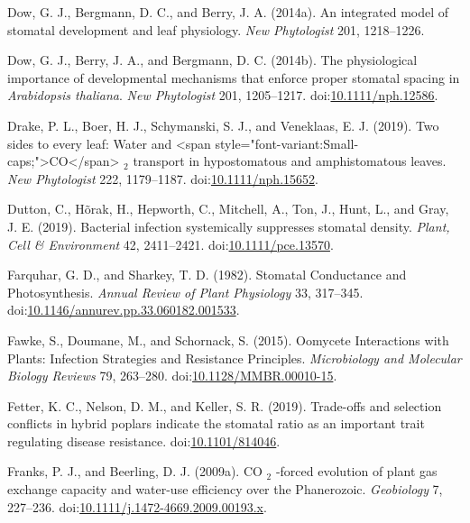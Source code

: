 \documentclass[utf8]{frontiersSCNS}
\begin{document}
\leavevmode\hypertarget{ref-dow_integrated_2014}{}%
Dow, G. J., Bergmann, D. C., and Berry, J. A. (2014a). An integrated
model of stomatal development and leaf physiology. \emph{New
Phytologist} 201, 1218--1226.

\leavevmode\hypertarget{ref-dow_physiological_2014}{}%
Dow, G. J., Berry, J. A., and Bergmann, D. C. (2014b). The physiological
importance of developmental mechanisms that enforce proper stomatal
spacing in \emph{Arabidopsis thaliana}. \emph{New Phytologist} 201,
1205--1217.
doi:\href{https://doi.org/10.1111/nph.12586}{10.1111/nph.12586}.

\leavevmode\hypertarget{ref-drake_two_2019}{}%
Drake, P. L., Boer, H. J., Schymanski, S. J., and Veneklaas, E. J.
(2019). Two sides to every leaf: Water and \textless span
style="font-variant:Small-caps;"\textgreater CO\textless/span\textgreater{}
\(_{\textrm{2}}\) transport in hypostomatous and amphistomatous leaves.
\emph{New Phytologist} 222, 1179--1187.
doi:\href{https://doi.org/10.1111/nph.15652}{10.1111/nph.15652}.

\leavevmode\hypertarget{ref-dutton_bacterial_2019}{}%
Dutton, C., Hõrak, H., Hepworth, C., Mitchell, A., Ton, J., Hunt, L.,
and Gray, J. E. (2019). Bacterial infection systemically suppresses
stomatal density. \emph{Plant, Cell \& Environment} 42, 2411--2421.
doi:\href{https://doi.org/10.1111/pce.13570}{10.1111/pce.13570}.

\leavevmode\hypertarget{ref-farquhar_stomatal_1982}{}%
Farquhar, G. D., and Sharkey, T. D. (1982). Stomatal Conductance and
Photosynthesis. \emph{Annual Review of Plant Physiology} 33, 317--345.
doi:\href{https://doi.org/10.1146/annurev.pp.33.060182.001533}{10.1146/annurev.pp.33.060182.001533}.

\leavevmode\hypertarget{ref-fawke_oomycete_2015}{}%
Fawke, S., Doumane, M., and Schornack, S. (2015). Oomycete Interactions
with Plants: Infection Strategies and Resistance Principles.
\emph{Microbiology and Molecular Biology Reviews} 79, 263--280.
doi:\href{https://doi.org/10.1128/MMBR.00010-15}{10.1128/MMBR.00010-15}.

\leavevmode\hypertarget{ref-fetter_trade-offs_2019}{}%
Fetter, K. C., Nelson, D. M., and Keller, S. R. (2019). Trade-offs and
selection conflicts in hybrid poplars indicate the stomatal ratio as an
important trait regulating disease resistance.
doi:\href{https://doi.org/10.1101/814046}{10.1101/814046}.

\leavevmode\hypertarget{ref-franks_co_2009}{}%
Franks, P. J., and Beerling, D. J. (2009a). CO \(_{\textrm{2}}\) -forced
evolution of plant gas exchange capacity and water-use efficiency over
the Phanerozoic. \emph{Geobiology} 7, 227--236.
doi:\href{https://doi.org/10.1111/j.1472-4669.2009.00193.x}{10.1111/j.1472-4669.2009.00193.x}.
\end{document}
